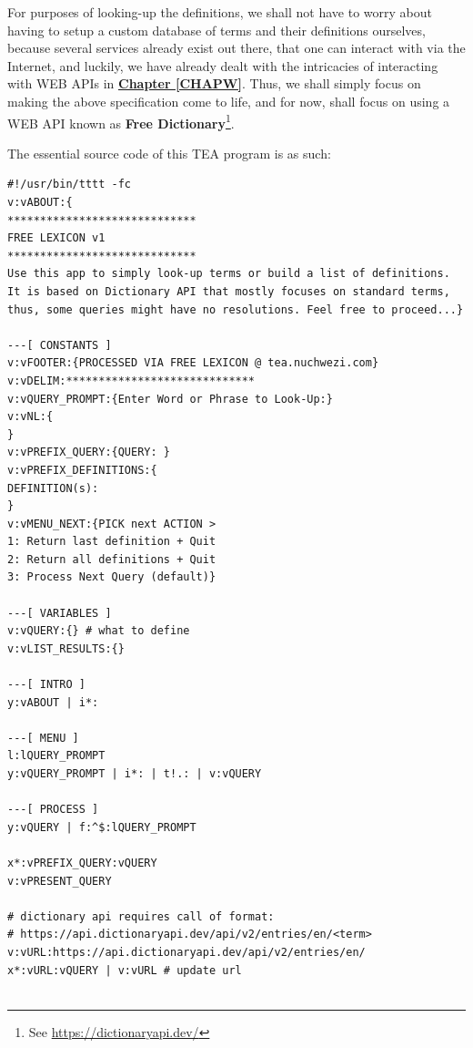 \documentclass[a4paper, 18pt]{book} %
\begin{document}
{{{For purposes of looking-up the definitions, we shall not have to worry about having to setup a custom database of terms and their definitions ourselves, because several services already exist out there, that one can interact with via the Internet, and luckily, we have already dealt with the intricacies of interacting with WEB APIs in \textbf{\hyperref[CHAPW]{Chapter \ref{CHAPW}}}. Thus, we shall simply focus on making the above specification come to life, and for now, shall focus on using a WEB API known as \textbf{Free Dictionary}\footnote{See \url{https://dictionaryapi.dev/}}.


\vspace{2em}

The essential source code of this TEA program is as such:

   \vspace{1em}

  \begin{tcolorbox}[teaterminalstyle, title=TEA Application: Free Dictionary | LEXICON v1, breakable]
  \begin{lstlisting}[language=TEA,breaklines=true,]
#!/usr/bin/tttt -fc
v:vABOUT:{
*****************************
FREE LEXICON v1
*****************************
Use this app to simply look-up terms or build a list of definitions.
It is based on Dictionary API that mostly focuses on standard terms, thus, some queries might have no resolutions. Feel free to proceed...}

---[ CONSTANTS ]
v:vFOOTER:{PROCESSED VIA FREE LEXICON @ tea.nuchwezi.com}
v:vDELIM:*****************************
v:vQUERY_PROMPT:{Enter Word or Phrase to Look-Up:}
v:vNL:{
}
v:vPREFIX_QUERY:{QUERY: }
v:vPREFIX_DEFINITIONS:{
DEFINITION(s):
}
v:vMENU_NEXT:{PICK next ACTION > 
1: Return last definition + Quit
2: Return all definitions + Quit
3: Process Next Query (default)}

---[ VARIABLES ]
v:vQUERY:{} # what to define
v:vLIST_RESULTS:{}

---[ INTRO ]
y:vABOUT | i*:

---[ MENU ]
l:lQUERY_PROMPT
y:vQUERY_PROMPT | i*: | t!.: | v:vQUERY

---[ PROCESS ]
y:vQUERY | f:^$:lQUERY_PROMPT

x*:vPREFIX_QUERY:vQUERY
v:vPRESENT_QUERY

# dictionary api requires call of format:
# https://api.dictionaryapi.dev/api/v2/entries/en/<term>
v:vURL:https://api.dictionaryapi.dev/api/v2/entries/en/
x*:vURL:vQUERY | v:vURL # update url


\end{lstlisting}
\end{tcolorbox}}}}
\end{document}
